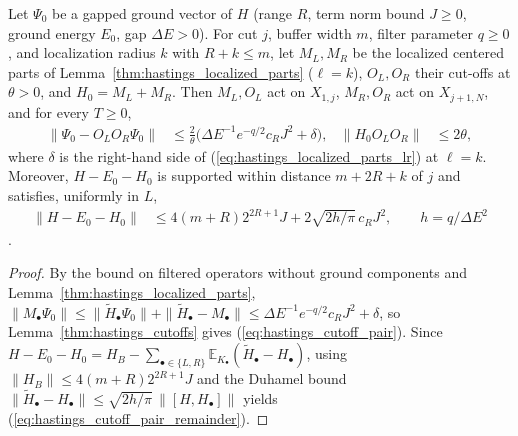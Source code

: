 \begin{lemma}
    \label{thm:hastings_cutoff_pair}
    \leanok
    Let $\Psi_0$ be a gapped ground vector of $H$ (range $R$, term norm bound
    $J\ge0$, ground energy $E_0$, gap $\Delta E>0$). For cut $j$, buffer width
    $m$, filter parameter $q\ge0$, and localization radius $k$ with
    $R+k\le m$, let $M_L,M_R$ be the localized centered parts of
    Lemma~\ref{thm:hastings_localized_parts} ($\ell=k$), $O_L,O_R$ their
    cut-offs at $\theta>0$, and $H_0=M_L+M_R$. Then $M_L,O_L$ act on $X_{1,j}$,
    $M_R,O_R$ act on $X_{j+1,N}$, and for every $T\ge0$,
    \begin{align}
        \|\Psi_0-O_LO_R\Psi_0\|
         & \le\frac2\theta\bigl(\Delta E^{-1}e^{-q/2}c_RJ^2+\delta\bigr), &
        \|H_0O_LO_R\|
         & \le2\theta,
        \label{eq:hastings_cutoff_pair}
    \end{align}
    where $\delta$ is the right-hand side of
    (\ref{eq:hastings_localized_parts_lr}) at $\ell=k$. Moreover,
    $H-E_0-H_0$ is supported within distance $m+2R+k$ of $j$ and satisfies,
    uniformly in $L$,
    \begin{align}
        \|H-E_0-H_0\| & \le4(m+R)2^{2R+1}J+2\sqrt{2h/\pi}\,c_RJ^2,
        \qquad h=q/\Delta E^2
        \label{eq:hastings_cutoff_pair_remainder}
    \end{align}
    \cite[lines 766--842]{Hastings2007AreaLaw}.
\end{lemma}
\begin{proof}\leanok
    By the bound on filtered operators without ground components
    \cite[``Filtered operators without ground components'']{QICLean2026Blueprint}
    and Lemma~\ref{thm:hastings_localized_parts},
    $\|M_\bullet\Psi_0\|\le\|\widetilde H_\bullet\Psi_0\|
        +\|\widetilde H_\bullet-M_\bullet\|\le\Delta E^{-1}e^{-q/2}c_RJ^2+\delta$,
    so Lemma~\ref{thm:hastings_cutoffs} gives (\ref{eq:hastings_cutoff_pair}).
    Since $H-E_0-H_0=H_B-\sum_{\bullet\in\{L,R\}}\mathbb E_{K_\bullet}(\widetilde H_\bullet-H_\bullet)$,
    using $\|H_B\|\le4(m+R)2^{2R+1}J$ and the Duhamel bound
    $\|\widetilde H_\bullet-H_\bullet\|\le\sqrt{2h/\pi}\,\|[H,H_\bullet]\|$
    yields (\ref{eq:hastings_cutoff_pair_remainder}).
\end{proof}

